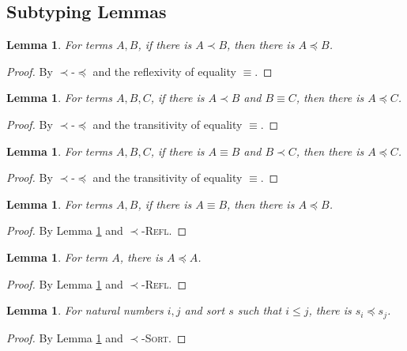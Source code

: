 \documentclass{article}
\newtheorem{lemma}[theorem]{Lemma}
\theoremstyle{definition}
\newcommand{\rname}[1]{\textsc{\footnotesize #1}}
\begin{document}
\subsection{Subtyping Lemmas}

\begin{lemma}\label{sub1sub}
  For terms $A, B$, if there is $A \prec B$, then there is $A \preceq B$.
\end{lemma}
\begin{proof}
  By \rname{$\prec$-$\preceq$} and the reflexivity of equality $\equiv$.
\end{proof}

\begin{lemma}\label{sub1conv}
  For terms $A, B, C$, if there is $A \prec B$ and $B \equiv C$, then there is $A \preceq C$.
\end{lemma}
\begin{proof}
  By \rname{$\prec$-$\preceq$} and the transitivity of equality $\equiv$.
\end{proof}

\begin{lemma}\label{convsub1}
  For terms $A, B, C$, if there is $A \equiv B$ and $B \prec C$, then there is $A \preceq C$.
\end{lemma}
\begin{proof}
  By \rname{$\prec$-$\preceq$} and the transitivity of equality $\equiv$.
\end{proof}

\begin{lemma}\label{convsub}
  For terms $A, B$, if there is $A \equiv B$, then there is $A \preceq B$.
\end{lemma}
\begin{proof}
  By Lemma \ref{convsub1} and \rname{$\prec$-Refl}.
\end{proof}

\begin{lemma}\label{subrefl}
  For term $A$, there is $A \preceq A$.
\end{lemma}
\begin{proof}
  By Lemma \ref{sub1sub} and \rname{$\prec$-Refl}.
\end{proof}

\begin{lemma}\label{subprop}
  For natural numbers $i, j$ and sort $s$ such that $i \leq j$, there is $s_i \preceq s_j$.
\end{lemma}
\begin{proof}
  By Lemma \ref{sub1sub} and \rname{$\prec$-Sort}.
\end{proof}
\end{document}
